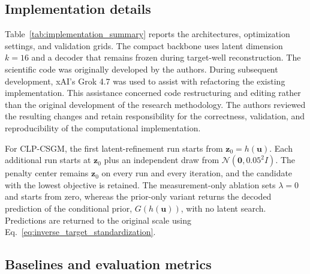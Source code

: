 \subsection{Implementation details}
\label{subsec:implementation}

Table~\ref{tab:implementation_summary} reports the architectures, optimization
settings, and validation grids. The compact backbone uses latent dimension
$k=16$ and a decoder that remains frozen during target-well reconstruction.
The scientific code was originally developed by the authors. During
subsequent development, xAI's Grok 4.7 was used to assist with refactoring
the existing implementation. This assistance concerned code restructuring and
editing rather than the original development of the research methodology.
The authors reviewed the resulting changes and retain responsibility for the
correctness, validation, and reproducibility of the computational
implementation.

\begin{table}[t]
    \centering
    \caption{Implementation settings for offline training, target-well latent
    refinement, and direct supervised baselines.}
    \label{tab:implementation_summary}
    \footnotesize
\end{table}

For CLP-CSGM, the first latent-refinement run starts from
$\boldsymbol{z}_0=h(\boldsymbol{u})$. Each additional run starts at
$\boldsymbol{z}_0$ plus an independent draw from
$\mathcal{N}(\boldsymbol{0},0.05^{2}I)$. The penalty center remains
$\boldsymbol{z}_0$ on every run and every iteration, and the candidate with
the lowest objective is retained. The measurement-only ablation sets
$\lambda=0$ and starts from zero, whereas the prior-only variant returns the
decoded prediction of the conditional prior, $G(h(\boldsymbol{u}))$, with no
latent search. Predictions are returned to the original scale using
Eq.~\eqref{eq:inverse_target_standardization}.

\subsection{Baselines and evaluation metrics}
\label{subsec:baselines_metrics}

